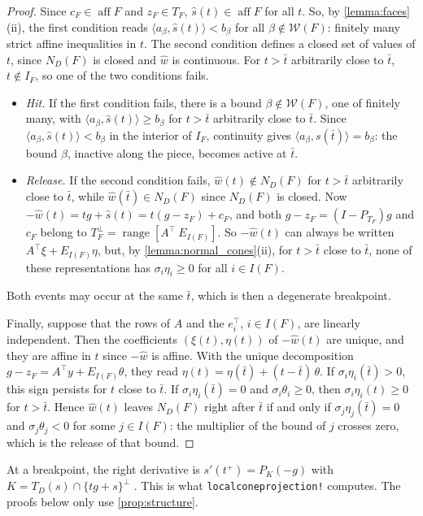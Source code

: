 \documentclass[11pt,a4paper]{article}
\numberwithin{equation}{section}
\theoremstyle{plain}
\theoremstyle{definition}
\theoremstyle{remark}
\newcommand{\inner}[2]{\langle #1,#2\rangle}
\newcommand{\aff}{\operatorname{aff}}
\newcommand{\calW}{\mathcal{W}}
\newcommand{\codeus}{\textunderscore\allowbreak}
\newcommand{\code}[1]{{\let\_\codeus\texttt{#1}}}
\begin{document}
\begin{proof}
Since $c_F\in\aff F$ and $z_F\in T_F$, $\hat s(t)\in\aff F$ for all $t$. So, by
\cref{lemma:faces}(ii), the first condition reads $\inner{a_\beta}{\hat s(t)}<b_\beta$ for all
$\beta\notin\calW(F)$: finitely many strict affine inequalities in $t$. The second condition
defines a closed set of values of $t$, since $N_D(F)$ is closed and $\hat w$ is continuous. For
$t>\bar t$ arbitrarily close to $\bar t$, $t\notin I_F$, so one of the two conditions fails.
\begin{itemize}
\item \emph{Hit.} If the first condition fails, there is a bound $\beta\notin\calW(F)$, one of
  finitely many, with $\inner{a_\beta}{\hat s(t)}\ge b_\beta$ for $t>\bar t$ arbitrarily close to
  $\bar t$. Since $\inner{a_\beta}{\hat s(t)}<b_\beta$ in the interior of $I_F$, continuity
  gives $\inner{a_\beta}{s(\bar t)}=b_\beta$: the bound $\beta$, inactive along the piece,
  becomes active at $\bar t$.
\item \emph{Release.} If the second condition fails, $\hat w(t)\notin N_D(F)$ for $t>\bar t$
  arbitrarily close to $\bar t$, while $\hat w(\bar t)\in N_D(F)$ since $N_D(F)$ is closed. Now
  $-\hat w(t)=tg+\hat s(t)=t(g-z_F)+c_F$, and both $g-z_F=(I-P_{T_F})g$ and $c_F$ belong to
  $T_F^\perp=\operatorname{range}[A^\top\ E_{I(F)}]$. So $-\hat w(t)$ can always be written
  $A^\top\xi+E_{I(F)}\eta$, but, by \cref{lemma:normal_cones}(ii), for $t>\bar t$ close to
  $\bar t$, none of these representations has $\sigma_i\eta_i\ge0$ for all $i\in I(F)$.
\end{itemize}
Both events may occur at the same $\bar t$, which is then a degenerate breakpoint.

Finally, suppose that the rows of $A$ and the $e_i^\top$, $i\in I(F)$, are linearly independent.
Then the coefficients $(\xi(t),\eta(t))$ of $-\hat w(t)$ are unique, and they are affine in $t$
since $-\hat w$ is affine. With the unique decomposition $g-z_F=A^\top y+E_{I(F)}\theta$, they
read $\eta(t)=\eta(\bar t)+(t-\bar t)\,\theta$. If $\sigma_i\eta_i(\bar t)>0$, this sign persists
for $t$ close to $\bar t$. If $\sigma_i\eta_i(\bar t)=0$ and $\sigma_i\theta_i\ge0$, then
$\sigma_i\eta_i(t)\ge0$ for $t>\bar t$. Hence $\hat w(t)$ leaves $N_D(F)$ right after $\bar t$ if
and only if $\sigma_j\eta_j(\bar t)=0$ and $\sigma_j\theta_j<0$ for some $j\in I(F)$: the
multiplier of the bound of $j$ crosses zero, which is the release of that bound.
\end{proof}

At a breakpoint, the right derivative is $s'(t^+)=P_K(-g)$ with $K=T_D(s)\cap\{tg+s\}^\perp$
\cite{Har77}. This is what \code{local\_cone\_projection!} computes. The proofs below only use
\cref{prop:structure}.
\end{document}

